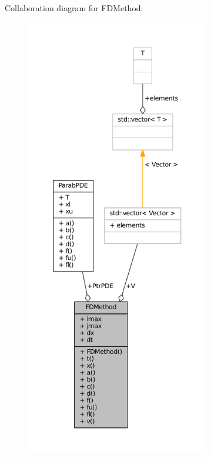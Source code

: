 Collaboration diagram for F\+D\+Method\+:\nopagebreak
\begin{figure}[H]
\begin{center}
\leavevmode
\includegraphics[height=550pt]{classFDMethod__coll__graph}
\end{center}
\end{figure}
